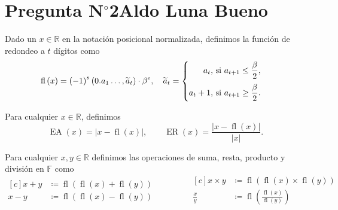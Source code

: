 \section{Pregunta N$^{\circ}$2\qquad Aldo Luna Bueno}

\begin{frame}
	\begin{definition}[Redondeo]
		Dado un $x\in\mathbb{R}$ en la notación posicional normalizada,
		definimos la función de redondeo a $t$ dígitos como
		\begin{equation*}
			\operatorname{fl}\left(x\right)=
			{\left(-1\right)}^{s}
			\left(
			0.a_{1}\dotsc,\widetilde{a}_{t}
			\right)\cdot
			\beta^{e},\quad
			\widetilde{a}_{t}=
			\begin{cases}
				\begin{aligned}
					a_{t},   & \text{ si }a_{t+1}\leq\frac{\beta}{2}, \\[\baselineskip]
					a_{t}+1, & \text{ si }a_{t+1}\geq\frac{\beta}{2}.
				\end{aligned}
			\end{cases}
		\end{equation*}
	\end{definition}

	\begin{definition}
		Para cualquier $x\in\mathbb{R}$, definimos
		\begin{equation*}
			\operatorname{EA}\left(x\right)=
			\left|
			x-
			\operatorname{fl}\left(x\right)\right|,\qquad
			\operatorname{ER}\left(x\right)=
			\frac{
				\left|
				x-
				\operatorname{fl}\left(x\right)\right|
			}{
				\left|
				x
				\right|
			}.
		\end{equation*}
	\end{definition}

	\begin{definition}
		Para cualquier $x,y\in\mathbb{R}$ definimos las operaciones de
		suma, resta, producto y división en $\mathbb{F}$ como
		\begin{equation*}
			\begin{aligned}[c]
				x+y & \coloneqq
				\operatorname{fl}
				\left(
				\operatorname{fl}\left(x\right)+
				\operatorname{fl}\left(y\right)
				\right)         \\
				x-y & \coloneqq
				\operatorname{fl}
				\left(
				\operatorname{fl}\left(x\right)-
				\operatorname{fl}\left(y\right)
				\right)
			\end{aligned}
			\qquad\qquad
			\begin{aligned}[c]
				x\times y   & \coloneqq
				\operatorname{fl}
				\left(
				\operatorname{fl}\left(x\right)\times
				\operatorname{fl}\left(y\right)
				\right)                 \\
				\frac{x}{y} & \coloneqq
				\operatorname{fl}
				\left(
				\frac{\operatorname{fl}\left(x\right)}{\operatorname{fl}\left(y\right)}
				\right)
			\end{aligned}
		\end{equation*}
	\end{definition}
\end{frame}

